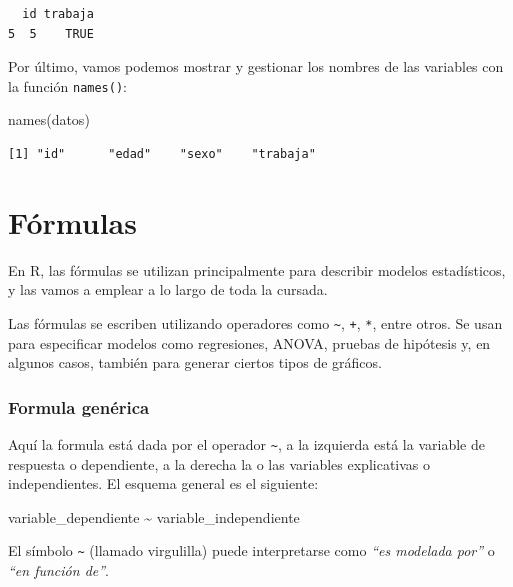 \documentclass[
  spanish,
  a4paper,
]{scrbook}
\newenvironment{Shaded}{\begin{snugshade}}{\end{snugshade}}
\newcommand{\FunctionTok}[1]{\textcolor[rgb]{0.28,0.35,0.67}{#1}}
\newcommand{\NormalTok}[1]{\textcolor[rgb]{0.00,0.23,0.31}{#1}}
\newcommand{\SpecialCharTok}[1]{\textcolor[rgb]{0.37,0.37,0.37}{#1}}
\begin{document}
\begin{verbatim}
  id trabaja
5  5    TRUE
\end{verbatim}

Por último, vamos podemos mostrar y gestionar los nombres de las
variables con la función \texttt{names()}:

\begin{Shaded}
\begin{Highlighting}[]
\FunctionTok{names}\NormalTok{(datos)}
\end{Highlighting}
\end{Shaded}

\begin{verbatim}
[1] "id"      "edad"    "sexo"    "trabaja"
\end{verbatim}

\section{Fórmulas}\label{fuxf3rmulas}

En R, las fórmulas se utilizan principalmente para describir modelos
estadísticos, y las vamos a emplear a lo largo de toda la cursada.

Las fórmulas se escriben utilizando operadores como
\texttt{\textasciitilde{}}, \texttt{+}, \texttt{*}, entre otros. Se usan
para especificar modelos como regresiones, ANOVA, pruebas de hipótesis
y, en algunos casos, también para generar ciertos tipos de gráficos.

\subsubsection{Formula genérica}\label{formula-genuxe9rica}

Aquí la formula está dada por el operador \texttt{\textasciitilde{}}, a
la izquierda está la variable de respuesta o dependiente, a la derecha
la o las variables explicativas o independientes. El esquema general es
el siguiente:

\begin{Shaded}
\begin{Highlighting}[]
\NormalTok{variable\_dependiente }\SpecialCharTok{\textasciitilde{}}\NormalTok{ variable\_independiente}
\end{Highlighting}
\end{Shaded}

El símbolo \texttt{\textasciitilde{}} (llamado virgulilla) puede
interpretarse como \emph{``es modelada por''} o \emph{``en función
de''}.
\end{document}

